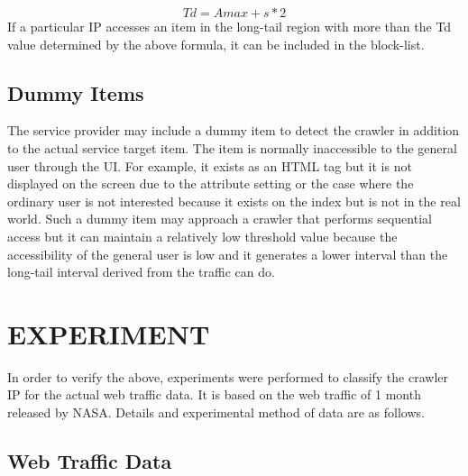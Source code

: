 \documentclass[sigconf,anonymous=false]{acmart}
\begin{document}
  \begin{displaymath}
    Td = Amax + s * 2
  \end{displaymath}\newline
If a particular IP accesses an item in the long-tail region with more than the Td value determined by the above formula, it can be included in the block-list.

\subsection{Dummy Items}
The service provider may include a dummy item to detect the crawler in addition to the actual service target item. The item is normally inaccessible to the general user through the UI. For example, it exists as an HTML tag but it is not displayed on the screen due to the attribute setting or the case where the ordinary user is not interested because it exists on the index but is not in the real world.
Such a dummy item may approach a crawler that performs sequential access but it can maintain a relatively low threshold value because the accessibility of the general user is low and it generates a lower interval than the long-tail interval derived from the traffic can do.



%
%
\section{EXPERIMENT}
In order to verify the above, experiments were performed to classify the crawler IP for the actual web traffic data. It is based on the web traffic of 1 month released by NASA. Details and experimental method of data are as follows.


\subsection{Web Traffic Data}
\end{document}
